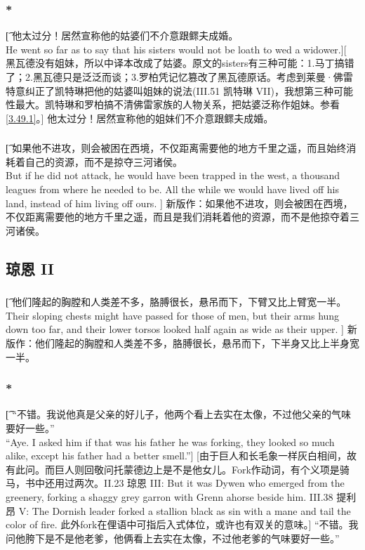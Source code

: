 \documentclass[12pt,a4paper]{article}
\begin{document}
\subsubsection{\color{red}*}\t[	
	他太过分！居然宣称他的姑婆们不介意跟鳏夫成婚。\\
	He went so far as to say that his sisters would not be loath to wed a widower.][
	黑瓦德没有姐妹，所以中译本改成了姑婆。原文的sisters有三种可能：1.马丁搞错了；2.黑瓦德只是泛泛而谈；3.罗柏凭记忆篡改了黑瓦德原话。考虑到莱曼·佛雷特意纠正了凯特琳把他的姑婆叫姐妹的说法(III.51 凯特琳 VII)，我想第三种可能性最大。凯特琳和罗柏搞不清佛雷家族的人物关系，把姑婆泛称作姐妹。参看\ref{3.49.1}。]
	他太过分！居然宣称他的姐妹们不介意跟鳏夫成婚。
	
\subsubsection{}\t[
	如果他不进攻，则会被困在西境，不仅距离需要他的地方千里之遥，而且始终消耗着自己的资源，而不是掠夺三河诸侯。\\
	But if he did not attack, he would have been trapped in the west, a thousand leagues from where he needed to be. All the while we would have lived off his land, instead of him living off ours. ]
	新版作：如果他不进攻，则会被困在西境，不仅距离需要他的地方千里之遥，而且是我们消耗着他的资源，而不是他掠夺着三河诸侯。
	
\subsection{琼恩 II}
\subsubsection{}\t[
	他们隆起的胸膛和人类差不多，胳膊很长，悬吊而下，下臂又比上臂宽一半。\\
	Their sloping chests might have passed for those of men, but their arms hung down too far, and their lower torsos looked half again as wide as their upper. ]
	新版作：他们隆起的胸膛和人类差不多，胳膊很长，悬吊而下，下半身又比上半身宽一半。
	
	\subsubsection{\color{red}*}\t[		
	“不错。我说他真是父亲的好儿子，他两个看上去实在太像，不过他父亲的气味要好一些。”\\		
	“Aye. I asked him if that was his father he was forking, they looked so much alike, except his father had a better smell.”]		
	[由于巨人和长毛象一样灰白相间，故有此问。而巨人则回敬问托蒙德边上是不是他女儿。Fork作动词，有个义项是骑马，书中还用过两次。II.23 琼恩 III: But it was Dywen who emerged from the greenery, forking a shaggy grey garron with Grenn ahorse beside him. III.38 提利昂 V: The Dornish leader forked a stallion black as sin with a mane and tail the color of fire. 此外fork在俚语中可指后入式体位，或许也有双关的意味。]		
	“不错。我问他胯下是不是他老爹，他俩看上去实在太像，不过他老爹的气味要好一些。”
\end{document}
